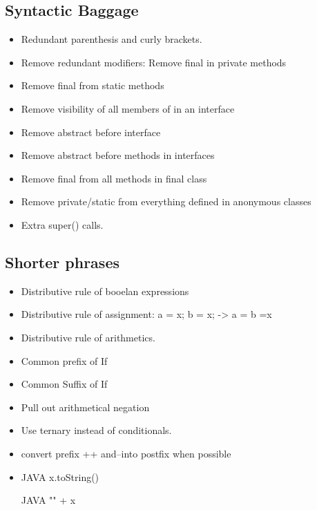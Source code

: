 \subsection{Syntactic Baggage}
\begin{itemize}
  \item Redundant parenthesis and curly brackets.
  \item Remove redundant modifiers: Remove final in private methods
  \item Remove final from static methods
  \item Remove visibility of all members of in an interface
  \item Remove abstract before interface
  \item Remove abstract before methods in interfaces
  \item Remove final from all methods in final class
  \item Remove private/static from everything defined in anonymous classes
  \item Extra super() calls.
\end{itemize}

\subsection{Shorter phrases}
\begin{itemize}
  \item Distributive rule of booelan expressions
  \item Distributive rule of assignment: a = x; b = x; -> a = b =x
  \item Distributive rule of arithmetics.
  \item Common prefix of If
  \item Common Suffix of If
  \item Pull out arithmetical negation
  \item Use ternary instead of conditionals.
  \item convert prefix ++ and--into postfix when possible
  \item
\begin{code}{JAVA}
x.toString()
\end{code}
\begin{code}{JAVA}
"" + x
\end{code}
\end{itemize}


